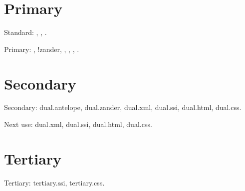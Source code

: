 \documentclass{report}
\begin{document}
\chapter{Primary}

Standard: , , .

Primary: , \idx!{zander}, , ,
, .

\chapter{Secondary}

Secondary: \gls{dual.antelope}, \gls{dual.zander}, \gls{dual.xml},
\gls{dual.ssi}, \gls{dual.html}, \gls{dual.css}.

Next use: \gls{dual.xml},
\gls{dual.ssi}, \gls{dual.html}, \gls{dual.css}.

\chapter{Tertiary}

Tertiary: \gls{tertiary.ssi}, \gls{tertiary.css}.

\printunsrtglossary
\printunsrtglossary[type=abbreviations]
\printunsrtglossary[type=index,style=mcolindexgroup]
\end{document}
